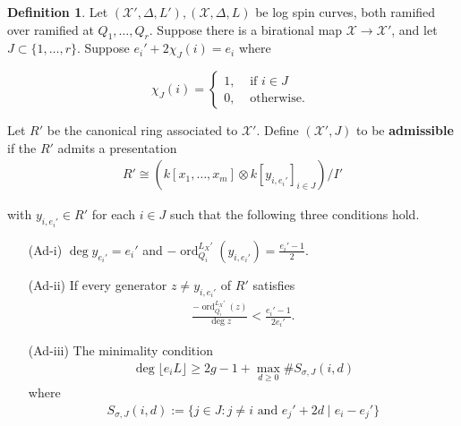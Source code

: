 \documentclass{amsart}
\theoremstyle{plain}
\theoremstyle{definition}
\newtheorem{defn}[thm]{Definition}
\theoremstyle{remark}
\numberwithin{equation}{section}
\newcommand \sx{\mathscr X}
\DeclareMathOperator{\ord}{ord}
\newcommand \subhalf[1]{\frac{{#1} - 1}{2{#1}}}
\newcommand \halfcan{L}
\begin{document}
\begin{defn}
\label{defn:admissible}
Let $(\sx', \Delta, L'),(\sx, \Delta , L)$ be log spin
curves, both ramified over ramified at $Q_1, \ldots, Q_r$. Suppose
there is a birational map $\sx \rightarrow \sx'$, and let $J \subset
\{1, \ldots, r\}$. Suppose $e_i'+ 2 \chi_J (i) = e_i$ where

$$\chi_J(i) = \begin{cases}
	1, &\text{ if }i \in J\\
	0, &\text{ otherwise. } 
\end{cases}$$

Let $R'$ be the canonical ring associated to $\sx'$. Define $(\sx',J)$
to be {\bf admissible} if the $R'$ admits a presentation
\begin{align*}
	R' \cong \left( k[x_1, \ldots, x_m] \otimes k[y_{i, e_i'}]_{i \in J} \right)/I'
\end{align*}

\noindent
with $y_{i, e_i'} \in R'$ for each $i \in J$ such that the following
three conditions hold.


\begin{enumerate}
	\item[(Ad-i)] $\deg y_{e_i'} = e_i'$ and $-\ord_{Q_i}
^{\halfcan_X'}(y_{i, e_i'})
		= \frac{e_i'- 1}{2}$.
	\item[(Ad-ii)] If every generator $z \neq y_{i, e_i'}$	of $R'$ satisfies
		\begin{align*}
			\frac{-\ord_{Q_i}
^{\halfcan_X'}(z)}{\deg z} < \subhalf {e_i'}.
		\end{align*}
	\item[(Ad-iii)] The minimality condition
		\begin{align*}
			\deg \lfloor e_i L \rfloor \geq 2g - 1 + \max_{d \geq 0} \# S_{\sigma, J}(i, d)
		\end{align*}
		where
		\begin{align*}
			S_{\sigma, J}(i, d) := \{j \in J : j \neq i \text{ and } e_j'+2d
			\mid e_i - e_j'\}
		\end{align*}
\end{enumerate}
\end{defn}
\end{document}
